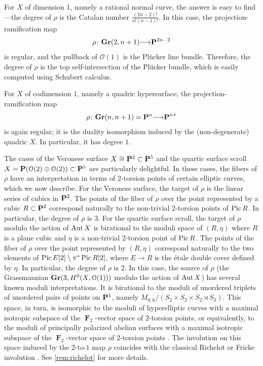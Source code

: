 \documentclass[11pt,reqno]{amsart}
\theoremstyle{plain}
\theoremstyle{definition}
\theoremstyle{remark}
\numberwithin{equation}{section}
\DeclareMathOperator{\F}{\mathbf F}
\renewcommand{\to}{{\longrightarrow}}
\numberwithin{equation}{section}
\renewcommand{\O}{\mathcal O}
\begin{document}
For $X$ of dimension 1, namely a rational normal curve, the answer is easy to find---the degree of $\rho$ is the Catalan number $\frac{(2n-2)!}{n!(n-1)!}$.
In this case, the projection-ramification map
\[ \rho \from \Gr(2, n+1) \to \P^{2n-2}\]
is regular, and the pullback of $\O(1)$ is the Pl\"ucker line bundle.
Therefore, the degree of $\rho$ is the top self-intersection of the Pl\"ucker bundle, which is easily computed using Schubert calculus.

For $X$ of codimension $1$, namely a quadric hypersurface, the projection-ramification map
\[ \rho \from \Gr(n, n+1) = \P^{n} \to {\P^n}^* \]
is again regular; it is the duality isomorphism induced by the (non-degenerate) quadric $X$.
In particular, it has degree $1$.

The cases of the Veronese surface $X \cong \P^2 \subset \P^5$ and the quartic surface scroll $X = \P(\O(2) \oplus \O(2)) \subset \P^5$ are particularly delightful.
In these cases, the fibers of $\rho$ have an interpretation in terms of 2-torsion points of certain elliptic curves, which we now describe.
For the Veronese surface, the target of $\rho$ is the linear series of cubics in $\P^2$.
The points of the fiber of $\rho$ over the point represented by a cubic $R \subset \P^2$ correspond naturally to the non-trivial 2-torsion points of $\Pic R$.
In particular, the degree of $\rho$ is $3$.
For the quartic surface scroll, the target of $\rho$ modulo the action of $\Aut X$ is birational to the moduli space of $(R, \eta)$ where $R$ is a plane cubic and $\eta$ is a non-trivial 2-torsion point of $\Pic R$.
The points of the fiber of $\rho$ over the point represented by $(R, \eta)$ correspond naturally to the two elements of $\Pic E[2] \setminus \pi^* \Pic R [2]$, where $E \to R$ is the \'etale double cover defined by $\eta$.
In particular, the degree of $\rho$ is $2$.
In this case, the source of $\rho$ (the Grassmannian $\Gr(3, H^0(X, \O(1)))$ modulo the action of $\Aut X$) has several known moduli interpretations.
It is birational to the moduli of unordered triplets of unordered pairs of points on $\P^1$, namely $M_{0,6}/(S_2 \times S_2 \times S_2 \rtimes S_3)$.
This space, in turn, is isomorphic to the moduli of hyperelliptic curves with a maximal isotropic subspace of the $\F_2$-vector space of $2$-torsion points, or equivalently, to the moduli of principally polarized abelian surfaces with a maximal isotropic subspace of the $\F_2$-vector space of $2$-torsion points \cite[Example~4.2]{dol.how:15}.
The involution on this space induced by the $2$-to-$1$ map $\rho$ coincides with the classical Richelot or Fricke involution \cite[Remark~4.3]{dol.how:15}.
See \autoref{rem:richelot} for more details.
\end{document}
